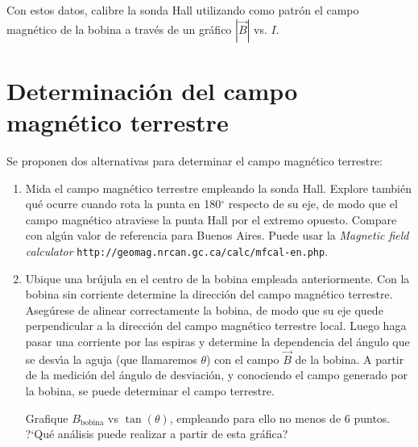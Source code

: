 \documentclass[laboratorio]{guia}
\begin{document}
Con estos datos, calibre la sonda Hall utilizando como patr\'on el campo
magn\'etico de la bobina a través de un gráfico \(|\vec{B}|\) vs. \(I\).


\section{Determinaci\'on del campo magn\'etico terrestre}

Se proponen dos alternativas para determinar el campo magn\'etico terrestre:
\begin{enumerate}
    \item Mida el campo magn\'etico terrestre empleando la sonda Hall.
        Explore tambi\'en qu\'e ocurre cuando rota la punta en 180$^\circ$
        respecto de su eje, de modo que el campo magn\'etico atraviese la punta
        Hall por el extremo opuesto. Compare con algún valor de referencia para Buenos Aires. Puede usar la \emph{Magnetic field calculator} \verb|http://geomag.nrcan.gc.ca/calc/mfcal-en.php|.

    \item Ubique una br\'ujula en el centro de la bobina empleada
        anteriormente. Con la bobina sin corriente determine la direcci\'on del
        campo magn\'etico terrestre. Aseg\'urese de alinear correctamente la
        bobina, de modo que su eje quede perpendicular a la direcci\'on del
        campo magn\'etico terrestre local. Luego haga pasar una corriente por
        las espiras y determine la dependencia del \'angulo que se desv\'\i a
        la aguja (que llamaremos $\theta$) con el campo $\vec{B}$ de la bobina. A partir de la medici\'on
        del \'angulo de desviaci\'on, y conociendo el campo generado por la
        bobina, se puede determinar el campo terrestre.
    	
		Grafique $B_\text{bobina}$ vs $\tan \left( \theta \right)$, empleando
        para ello no menos de 6 puntos. ?`Qu\'e an\'alisis puede realizar a
        partir de esta gr\'afica?
\end{enumerate}

\nocite{Alonso1998,Purcell1988,Reitz1996,Trelles1984}
 

\end{document}
